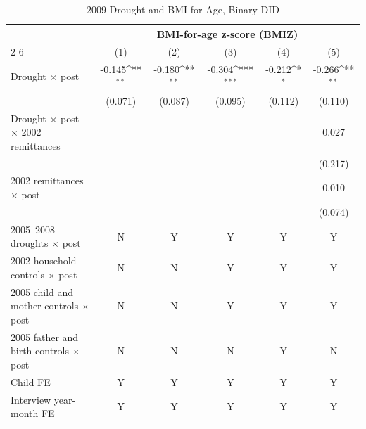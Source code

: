 \documentclass[12pt]{article}
\def\sym#1{\ifmmode^{#1}\else\(^{#1}\)\fi}
\begin{document}
\begin{longtable}{l*{5}{c}}
\caption{2009 Drought and BMI-for-Age, Binary DID}\\
\toprule
 & \multicolumn{5}{c}{BMI-for-age z-score (BMIZ)}\\
\cmidrule(lr){2-6}
            &\multicolumn{1}{c}{(1)}         &\multicolumn{1}{c}{(2)}         &\multicolumn{1}{c}{(3)}         &\multicolumn{1}{c}{(4)}         &\multicolumn{1}{c}{(5)}         \\
\midrule
Drought \ensuremath{\times} post&      -0.145\sym{**} &      -0.180\sym{**} &      -0.304\sym{***}&      -0.212\sym{*}  &      -0.266\sym{**} \\
            &     (0.071)         &     (0.087)         &     (0.095)         &     (0.112)         &     (0.110)         \\
Drought \ensuremath{\times} post \ensuremath{\times} 2002 remittances&                     &                     &                     &                     &       0.027         \\
            &                     &                     &                     &                     &     (0.217)         \\
2002 remittances \ensuremath{\times} post&                     &                     &                     &                     &       0.010         \\
            &                     &                     &                     &                     &     (0.074)         \\
\midrule
2005--2008 droughts \ensuremath{\times} post&           N         &           Y         &           Y         &           Y         &           Y         \\
2002 household controls \ensuremath{\times} post&           N         &           N         &           Y         &           Y         &           Y         \\
2005 child and mother controls \ensuremath{\times} post&           N         &           N         &           Y         &           Y         &           Y         \\
2005 father and birth controls \ensuremath{\times} post&           N         &           N         &           N         &           Y         &           N         \\
Child FE    &           Y         &           Y         &           Y         &           Y         &           Y         \\
Interview year-month FE&           Y         &           Y         &           Y         &           Y         &           Y         \\

\end{longtable}
\end{document}
